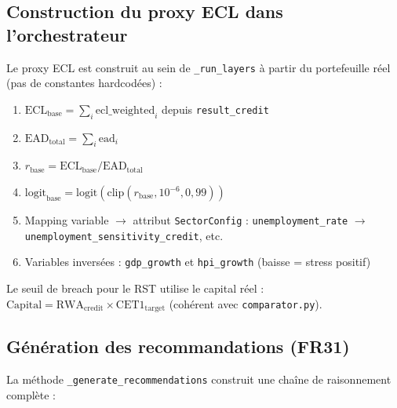 \documentclass[12pt,a4paper]{article}
\begin{document}
\subsection{Construction du proxy ECL dans l'orchestrateur}

Le proxy ECL est construit au sein de \texttt{\_run\_layers} \`a partir du portefeuille
r\'eel (pas de constantes hardcod\'ees) :

\begin{enumerate}[nosep]
    \item $\text{ECL}_{\text{base}} = \sum_i \text{ecl\_weighted}_i$ depuis \texttt{result\_credit}
    \item $\text{EAD}_{\text{total}} = \sum_i \text{ead}_i$
    \item $r_{\text{base}} = \text{ECL}_{\text{base}} / \text{EAD}_{\text{total}}$
    \item $\text{logit}_{\text{base}} = \text{logit}(\text{clip}(r_{\text{base}}, 10^{-6}, 0{,}99))$
    \item Mapping variable $\to$ attribut \texttt{SectorConfig} :
          \texttt{unemployment\_rate} $\to$ \texttt{unemployment\_sensitivity\_credit}, etc.
    \item Variables invers\'ees : \texttt{gdp\_growth} et \texttt{hpi\_growth}
          (baisse = stress positif)
\end{enumerate}

Le seuil de breach pour le RST utilise le capital r\'eel :
$\text{Capital} = \text{RWA}_{\text{credit}} \times \text{CET1}_{\text{target}}$
(coh\'erent avec \texttt{comparator.py}).

\subsection{G\'en\'eration des recommandations (FR31)}

La m\'ethode \texttt{\_generate\_recommendations} construit une cha\^ine de raisonnement
compl\`ete :
\end{document}

